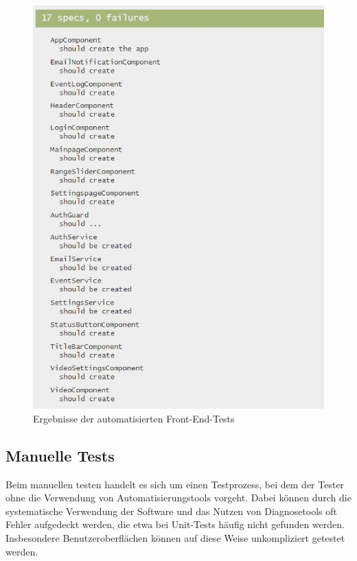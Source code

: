 \begin{figure}[ht]
	\flushright
	\includegraphics[]{content/pictures/ErgebnisseAutomatisierteTestsFrontend.jpg}
	\caption{Ergebnisse der automatisierten Front-End-Tests}
	\label{fig:ergebnisse_autom_tests_frontend}
\end{figure}


\subsection{Manuelle Tests}
\label{subsection_manuelle_tests}
Beim manuellen testen handelt es sich um einen Testprozess, bei dem der Tester ohne die Verwendung von Automatisierungstools vorgeht. Dabei können durch die systematische Verwendung der Software und das Nutzen von Diagnosetools oft Fehler aufgedeckt werden, die etwa bei Unit-Tests häufig nicht gefunden werden. Insbesondere Benutzeroberflächen können auf diese Weise unkompliziert getestet werden.

